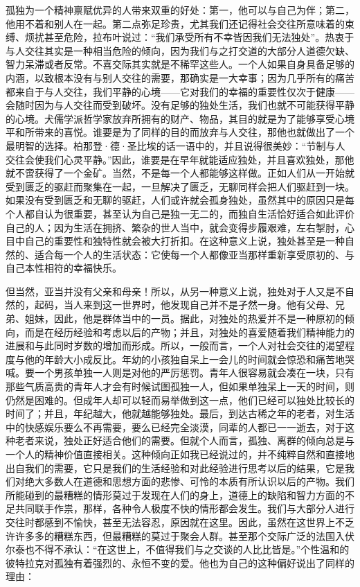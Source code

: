 \documentclass[11pt,oneside]{article}
\begin{document}
\begin{common-format}
孤独为一个精神禀赋优异的人带来双重的好处：第一，他可以与自己为伴；第二，他用不着和别人在一起。第二点弥足珍贵，尤其我们还记得社会交往所意味着的束缚、烦扰甚至危险，拉布叶说过：“我们承受所有不幸皆因我们无法独处”。热衷于与人交往其实是一种相当危险的倾向，因为我们与之打交道的大部分人道德欠缺、智力呆滞或者反常。不喜交际其实就是不稀罕这些人。一个人如果自身具备足够的内涵，以致根本没有与别人交往的需要，那确实是一大幸事；因为几乎所有的痛苦都来自于与人交往，我们平静的心境——它对我们的幸福的重要性仅次于健康——会随时因为与人交往而受到破坏。没有足够的独处生活，我们也就不可能获得平静的心境。犬儒学派哲学家放弃所拥有的财产、物品，其目的就是为了能够享受心境平和所带来的喜悦。谁要是为了同样的目的而放弃与人交往，那他也就做出了一个最明智的选择。柏那登·德·圣比埃的话一语中的，并且说得很美妙：“节制与人交往会使我们心灵平静。”因此，谁要是在早年就能适应独处，并且喜欢独处，那他就不啻获得了一个金矿。当然，不是每一个人都能够这样做。正如人们从一开始就受到匮乏的驱赶而聚集在一起，一旦解决了匮乏，无聊同样会把人们驱赶到一块。如果没有受到匮乏和无聊的驱赶，人们或许就会孤身独处，虽然其中的原因只是每个人都自认为很重要，甚至认为自己是独一无二的，而独自生活恰好适合如此评价自己的人；因为生活在拥挤、繁杂的世人当中，就会变得步履艰难，左右掣肘，心目中自己的重要性和独特性就会被大打折扣。在这种意义上说，独处甚至是一种自然的、适合每一个人的生活状态：它使每一个人都像亚当那样重新享受原初的、与自己本性相符的幸福快乐。 

但当然，亚当并没有父亲和母亲！所以，从另一种意义上说，独处对于人又是不自然的，起码，当人来到这一世界时，他发现自己并不是孑然一身。他有父母、兄弟、姐妹，因此，他是群体当中的一员。据此，对独处的热爱并不是一种原初的倾向，而是在经历经验和考虑以后的产物；并且，对独处的喜爱随着我们精神能力的进展和与此同时岁数的增加而形成。所以，一般而言，一个人对社会交往的渴望程度与他的年龄大小成反比。年幼的小孩独自呆上一会儿的时间就会惊恐和痛苦地哭喊。要一个男孩单独一人则是对他的严厉惩罚。青年人很容易就会凑在一块，只有那些气质高贵的青年人才会有时候试图孤独一人，但如果单独呆上一天的时间，则仍然是困难的。但成年人却可以轻而易举做到这一点，他们已经可以独处比较长的时间了；并且，年纪越大，他就越能够独处。最后，到达古稀之年的老者，对生活中的快感娱乐要么不再需要，要么已经完全淡漠，同辈的人都已一一逝去，对于这种老者来说，独处正好适合他们的需要。但就个人而言，孤独、离群的倾向总是与一个人的精神价值直接相关。这种倾向正如我已经说过的，并不纯粹自然和直接地出自我们的需要，它只是我们的生活经验和对此经验进行思考以后的结果，它是我们对绝大多数人在道德和思想方面的悲惨、可怜的本质有所认识以后的产物。我们所能碰到的最糟糕的情形莫过于发现在人们的身上，道德上的缺陷和智力方面的不足共同联手作祟，那样，各种令人极度不快的情形都会发生。我们与大部分人进行交往时都感到不愉快，甚至无法容忍，原因就在这里。因此，虽然在这世界上不乏许许多多的糟糕东西，但最糟糕的莫过于聚会人群。甚至那个交际广泛的法国入伏尔泰也不得不承认：“在这世上，不值得我们与之交谈的人比比皆是。”个性温和的彼特拉克对孤独有着强烈的、永恒不变的爱。他也为自己的这种偏好说出了同样的理由： 


\end{common-format}
\end{document}
